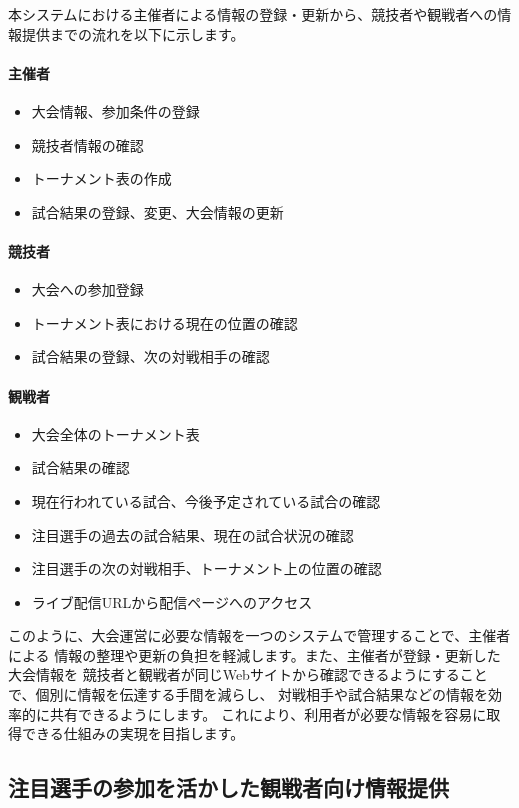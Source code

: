 本システムにおける主催者による情報の登録・更新から、競技者や観戦者への情報提供までの流れを以下に示します。

\paragraph{主催者}
\begin{itemize}
  \item 大会情報、参加条件の登録
  \item 競技者情報の確認
  \item トーナメント表の作成
  \item 試合結果の登録、変更、大会情報の更新
\end{itemize}
\paragraph{競技者}
\begin{itemize}
  \item 大会への参加登録
  \item トーナメント表における現在の位置の確認
  \item 試合結果の登録、次の対戦相手の確認
\end{itemize}
\paragraph{観戦者}
\begin{itemize}
  \item 大会全体のトーナメント表
  \item 試合結果の確認
  \item 現在行われている試合、今後予定されている試合の確認
  \item 注目選手の過去の試合結果、現在の試合状況の確認
  \item 注目選手の次の対戦相手、トーナメント上の位置の確認
  \item ライブ配信URLから配信ページへのアクセス
\end{itemize}

このように、大会運営に必要な情報を一つのシステムで管理することで、主催者による
情報の整理や更新の負担を軽減します。また、主催者が登録・更新した大会情報を
競技者と観戦者が同じWebサイトから確認できるようにすることで、個別に情報を伝達する手間を減らし、
対戦相手や試合結果などの情報を効率的に共有できるようにします。
これにより、利用者が必要な情報を容易に取得できる仕組みの実現を目指します。

\subsection{注目選手の参加を活かした観戦者向け情報提供}

